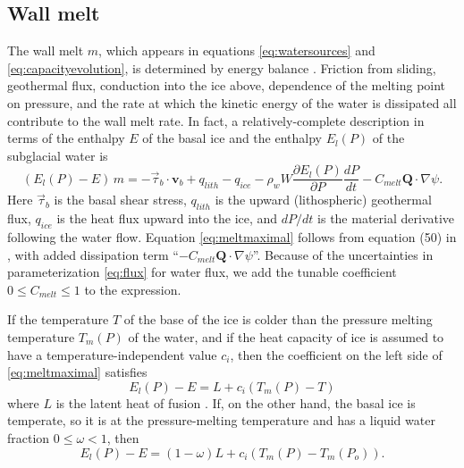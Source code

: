 \documentclass[11pt]{amsart}
\newcommand{\bv}{\mathbf{v}}
\newcommand{\Cmelt}{C_{melt}}
\begin{document}
\subsection*{Wall melt}  The wall melt $m$, which appears in equations \eqref{eq:watersources} and \eqref{eq:capacityevolution}, is determined by energy balance \citep{Hewitt2011}.  Friction from sliding, geothermal flux, conduction into the ice above, dependence of the melting point on pressure, and the rate at which the kinetic energy of the water is dissipated all contribute to the wall melt rate.  In fact, a relatively-complete description in terms of the enthalpy $E$ of the basal ice \citep{AschwandenBuelerKhroulevBlatter} and the enthalpy $E_l(P)$ of the subglacial water is
\begin{equation}\label{eq:meltmaximal}
(E_l(P) - E)\, m = -\vec \tau_b\cdot \bv_b + q_{lith} - q_{ice} - \rho_w W \frac{\partial E_l(P)}{\partial P} \frac{dP}{dt} - \Cmelt \mathbf{Q} \cdot \nabla \psi.
\end{equation}
Here $\vec\tau_b$ is the basal shear stress, $q_{lith}$ is the upward (lithospheric) geothermal flux, $q_{ice}$ is the heat flux upward into the ice, and $dP/dt$ is the material derivative following the water flow.  Equation \eqref{eq:meltmaximal} follows from equation (50) in \citet{AschwandenBuelerKhroulevBlatter}, with added dissipation term ``$- \Cmelt \mathbf{Q} \cdot \nabla \psi$''.  Because of the uncertainties in parameterization \eqref{eq:flux} for water flux, we add the tunable coefficient $0\le \Cmelt \le 1$ to the expression.

If the temperature $T$ of the base of the ice is colder than the pressure melting temperature $T_m(P)$ of the water, and if the heat capacity of ice is assumed to have a temperature-independent value $c_i$, then the coefficient on the left side of \eqref{eq:meltmaximal} satisfies
	$$E_l(P) - E = L + c_i (T_m(P) - T)$$
where $L$ is the latent heat of fusion \citep[equations (4) and (8)]{AschwandenBuelerKhroulevBlatter}.  If, on the other hand, the basal ice is temperate, so it is at the pressure-melting temperature and has a liquid water fraction $0\le \omega < 1$, then
	$$E_l(P) - E = (1-\omega) L + c_i (T_m(P) - T_m(P_o)).$$
\end{document}

